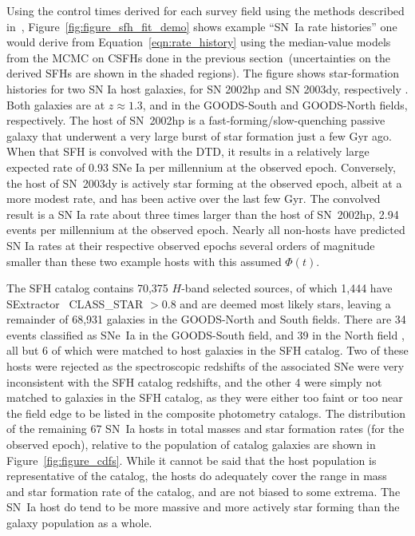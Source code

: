\documentclass[apj, twocolumn]{aastex62}
\begin{document}
Using the control times derived for each survey field using the methods described in~\cite{Strolger:2015aa}, Figure~\ref{fig:figure_sfh_fit_demo} shows example ``SN~Ia rate histories'' one would derive from Equation~\ref{eqn:rate_history} using the median-value models from the MCMC on CSFHs done in the previous section~{(uncertainties on the derived SFHs are shown in the shaded regions)}. The figure shows star-formation histories for two SN Ia host galaxies, for SN 2002hp and SN 2003dy, respectively \cite[see][ for further details on these events]{Strolger:2004}. Both galaxies are at $z\approx 1.3$, and in the GOODS-South and GOODS-North fields, respectively. The host of SN~2002hp is a fast-forming/slow-quenching passive galaxy that underwent a very large burst of star formation just a few Gyr ago. When that SFH is convolved with the DTD, it results in a relatively large expected rate of 0.93 SNe Ia per millennium at the observed epoch.  Conversely, the host of SN~2003dy is actively star forming at the observed epoch, albeit at a more modest rate, and has been active over the last few Gyr. The convolved result is a SN Ia rate about three times larger than the host of SN~2002hp, 2.94 events per millennium at the observed epoch. Nearly all non-hosts have predicted SN Ia rates at their respective observed epochs several orders of magnitude smaller than these two example hosts with this assumed $\Phi(t)$.
  
  
The SFH catalog contains 70,375 {$H$-band selected sources, of which 1,444 have SExtractor~\citep{Bertin:1996,Bertin:yg} CLASS\_STAR $> 0.8$ and are deemed most likely stars, leaving a remainder of 68,931} galaxies in the GOODS-North and South fields. There are 34 events classified as SNe~Ia in the GOODS-South field, and 39 in the North field \citep{Strolger:2004, Dahlen:2008, Rodney:2014fj}, all but 6 of which were matched to host galaxies in the SFH catalog. Two of these hosts were rejected as the spectroscopic redshifts of the associated SNe were very inconsistent with the SFH catalog redshifts, and the other 4 were simply not matched to galaxies in the SFH catalog, as they were either too faint or too near the field edge to be listed in the composite photometry catalogs. {The distribution of the remaining 67 SN~Ia hosts in total masses and star formation rates (for the observed epoch), relative to the population of catalog galaxies are shown in Figure~\ref{fig:figure_cdfs}. While it cannot be said that the host population is representative of the catalog, the hosts do adequately cover the range in mass and star formation rate of the catalog, and are not biased to some extrema. The SN~Ia host do tend to be more massive and more actively star forming than the galaxy population as a whole.}
\end{document}
